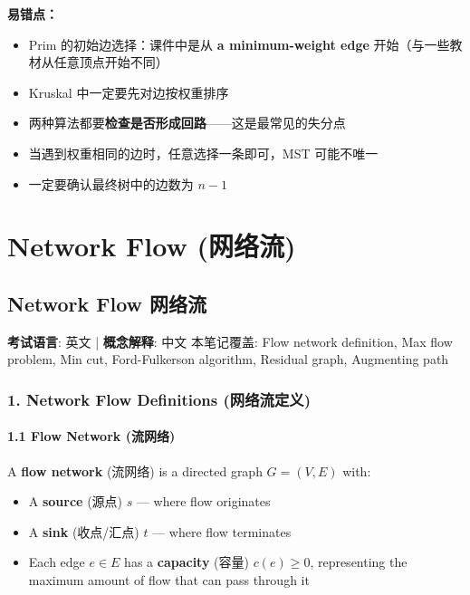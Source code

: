 \documentclass[10pt,a4paper,openany]{ctexbook}
\theoremstyle{definition}
\theoremstyle{remark}
\renewenvironment{quote}
  {\list{}{\leftmargin=1em\rightmargin=0pt\topsep=0.5pt\partopsep=0pt}\item[]}
  {\endlist}
\begin{document}
\textbf{易错点：}
\begin{itemize}
\item Prim 的初始边选择：课件中是从 \textbf{a minimum-weight edge} 开始（与一些教材从任意顶点开始不同）
\item Kruskal 中一定要先对边按权重排序
\item 两种算法都要\textbf{检查是否形成回路}——这是最常见的失分点
\item 当遇到权重相同的边时，任意选择一条即可，MST 可能不唯一
\item 一定要确认最终树中的边数为 $n-1$

\end{itemize}

\chapter{Network Flow (网络流)}

\section{Network Flow 网络流}

\begin{quote}
\textbf{考试语言}: 英文 | \textbf{概念解释}: 中文
本笔记覆盖: Flow network definition, Max flow problem, Min cut, Ford-Fulkerson algorithm, Residual graph, Augmenting path

\end{quote}
\vspace{-2pt}

\subsection{1. Network Flow Definitions (网络流定义)}

\subsubsection{1.1 Flow Network (流网络)}

A \textbf{flow network} (流网络) is a directed graph $G = (V, E)$ with:
\begin{itemize}
\item A \textbf{source} (源点) $s$ — where flow originates
\item A \textbf{sink} (收点/汇点) $t$ — where flow terminates
\item Each edge $e \in E$ has a \textbf{capacity} (容量) $c(e) \ge 0$, representing the maximum amount of flow that can pass through it

\end{itemize}
\end{document}
